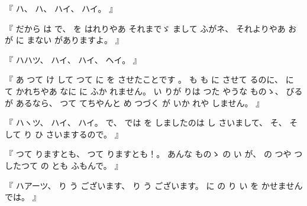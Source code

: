 %
『
ハ、
%
ハ、
%
ハイ、
%
ハイ。
』

%
『
だから
は
で、
%
を
はれりやあ
それまでゞ
まして
ふがネ、
%
それよりやあ
お
が
に
まない
がありますよ。
』

%
『
ハハツ、
%
ハイ、
%
ハイ、
%
ヘイ。
』

%
『
あ
つて
け
して
つて
に
を%
させたことです
。
%
%
も
も
に
させて
るのに、
%
に
て
かれちやあ
なに
に%
ふか
れません。
%
い
りが
りは
つた
やうな
ものゝ、
%
びる
が
あるなら、
%
つて
てちやんと
め
つづく%
が
いか
れや
しません。
』

%
『
ハヽツ、
%
ハイ、
%
ハイ。
%
で、
%
では
を
しましたのは
し
さいまして、
%
そ、
%
そして
り
ひ
さいまするので。
』

%
『
つて
りますとも、
%
つて
りますとも！。
%
あんな
ものゝ%
の
い
が、
%
の
つや
つ
したつて
の
とも
ふもんで。
』

%
『
ハアーツ、
%
り
う
ございます、
%
り
う
ございます。
%
に
の
り
い
を
かせませんでは。
』


